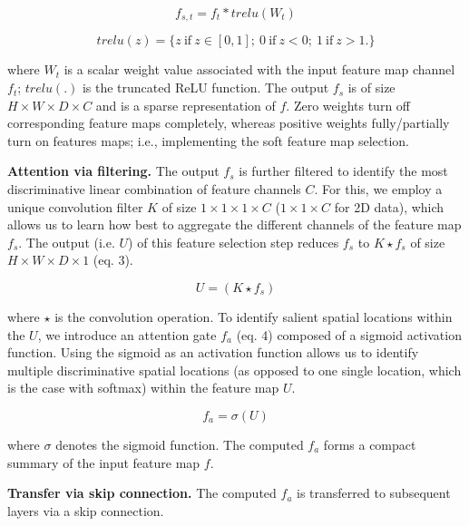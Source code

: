 \documentclass{article}
\begin{document}
\begin{equation}
f_{s,t} = f_{t}\ast trelu (W_t)
\end{equation}

\begin{equation}
trelu(z) = \{z \ \textrm{if} \ z\in [0,1]; \ 0 \ \textrm{if} \ z<0; \ 1 \ \textrm{if} \ z>1. \}
\end{equation}

\noindent where $W_t$ is a scalar weight value associated with the input feature map channel $f_t$; $trelu(.)$ is the truncated ReLU function. The output $f_s$ is of size $H\times W\times D\times C$ and is a sparse representation of $f$. Zero weights turn off corresponding feature maps completely, whereas positive weights fully/partially turn on features maps; i.e., implementing the soft feature map selection.

\noindent \textbf{Attention via filtering.} The output $f_s$ is further filtered to identify the most discriminative linear combination of feature channels $C$. For this, we employ a unique convolution filter $K$ of size $1\times 1\times 1\times C$ ($1\times 1\times C$ for 2D data), which allows us to learn how best to aggregate the different channels of the feature map $f_s$. The output (i.e. $U$) of this feature selection step reduces $f_s$ to $K\star f_s$ of size $H\times W\times D\times 1$ (eq. 3). 

\begin{equation}
U=(K\star f_s)
\end{equation}


\noindent where $\star$ is the convolution operation. To identify salient spatial locations within the $U$, we introduce an attention gate $f_a$ (eq. 4) composed of a sigmoid activation function. Using the sigmoid as an activation function allows us to identify multiple discriminative spatial locations (as opposed to one single location, which is the case with softmax) within the feature map $U$.

\begin{equation}
f_a= \sigma(U)
\end{equation}

\noindent where $\sigma$ denotes the sigmoid function. The computed $f_a$ forms a compact summary of the input feature map $f$.

\noindent \textbf{Transfer via skip connection.} The computed $f_a$ is transferred to subsequent layers via a skip connection.
\end{document}
